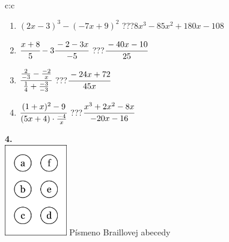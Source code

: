 \documentclass[10pt]{report}
\begin{document}
\begin{tabular}{c:c}
\begin{minipage}[c][104.5mm][t]{0.5\linewidth}
\begin{center}
\begin{minipage}{0.79\linewidth}
\begin{center}
\begin{varwidth}{\linewidth}
\begin{enumerate}
\item $(2x-3)^3-(-7x+9)^2$\quad \dotfill\; ???\;\dotfill \quad $8x^3-85x^2+180x-108$
\item $\cfrac{x+8}{5}-3\cfrac{-2-3x}{-5}$\quad \dotfill\; ???\;\dotfill \quad $\cfrac{-40x-10}{25}$
\item $\cfrac{\frac{2}{-3}-\frac{-2}{x}}{\frac{1}{4}+\frac{-3}{-3}}$\quad \dotfill\; ???\;\dotfill \quad $\cfrac{-24x+72}{45x}$
\item $\cfrac{(1+x)^2-9}{(5x+4)\cdot\frac{-4}{x}}$\quad \dotfill\; ???\;\dotfill \quad $\cfrac{x^3+2x^2-8x}{-20x-16}$
\end{enumerate}
\end{varwidth}
\end{center}
\end{minipage}
\begin{minipage}{0.20\linewidth}
\begin{center}
{\Huge\bfseries 4.} \\[2mm]
\includegraphics[height=40mm]{../images/braille.png}
{\small Písmeno Braillovej abecedy}
\end{center}
\end{minipage}
\end{center}
\end{minipage}
%
\end{tabular}
\newpage
\thispagestyle{empty}
\end{document}
